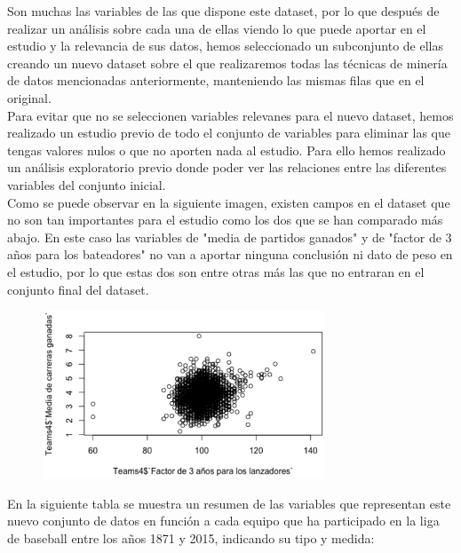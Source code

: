 \documentclass[10pt]{article}
\begin{document}
Son muchas las variables de las que dispone este dataset, por lo que después de realizar un análisis sobre cada una de ellas viendo lo que puede aportar en el estudio y la relevancia de sus datos, hemos seleccionado un subconjunto de ellas creando un nuevo dataset sobre el que realizaremos todas las técnicas de minería de datos mencionadas anteriormente, manteniendo las mismas filas que en el original.\\


Para evitar que no se seleccionen variables relevanes para el nuevo dataset, hemos realizado un estudio previo de todo el conjunto de variables para eliminar las que tengas valores nulos o que no aporten nada al estudio.  Para ello hemos realizado un análisis exploratorio previo donde poder ver las relaciones entre las diferentes variables del conjunto inicial.\\


Como se puede observar en la siguiente imagen, existen campos en el dataset que no son tan importantes para el estudio como los dos que se han comparado más abajo. En este caso las variables de "media de partidos ganados" y de "factor de 3 años para los bateadores" no van a aportar ninguna conclusión ni dato de peso en el estudio, por lo que estas dos son entre otras más las que no entraran en el conjunto final del dataset.

\begin{figure}[H]
	\begin{center}
 		\includegraphics[width = 0.75\textwidth]{Imagenes/preprocesamiento.eps}
	\end{center} 
\end{figure}

En la siguiente tabla se muestra un resumen de las variables que representan este nuevo conjunto de datos en función a cada equipo que ha participado en la liga de baseball entre los años 1871 y 2015, indicando su tipo y medida:\\
\end{document}

